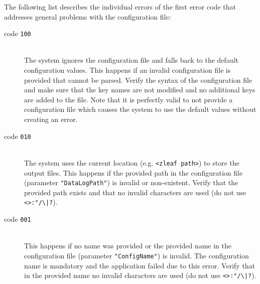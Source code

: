 \documentclass[a4paper,oneside]{book}
\begin{document}
The following list describes the individual errors of the first error code that addresses general problems with the configuration file:
\begin{description}
    \item[code \texttt{100}] \hfill \\
        The system ignores the configuration file and falls back to the default configuration values.
        This happens if an invalid configuration file is provided that cannot be parsed.
        Verify the syntax of the configuration file and make sure that the key names are not modified and no additional keys are added to the file.
        Note that it is perfectly valid to not provide a configuration file which causes the system to use the default values without creating an error.
    \item[code \texttt{010}] \hfill \\
        The system uses the current location (e.g. \texttt{<zleaf path>}) to store the output files.
        This happens if the provided path in the configuration file (parameter \texttt{"DataLogPath"}) is invalid or non-existent.
        Verify that the provided path exists and that no invalid characters are used (do not use \texttt{<>:"/\textbackslash |?}).
    \item[code \texttt{001}] \hfill \\
        This happens if no name was provided or the provided name in the configuration file (parameter \texttt{"ConfigName"}) is invalid.
        The configuration name is mandatory and the application failed due to this error.
        Verify that in the provided name no invalid characters are used (do not use \texttt{<>:"/\textbackslash |?}).
\end{description}
\end{document}
